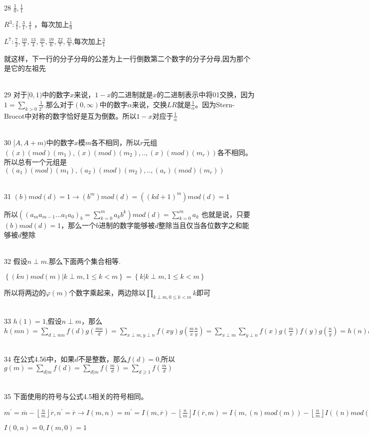 \documentclass[onecolumn]{article}
\begin{document}
~\\
28 $\frac{1}{0},\frac{1}{1}$ \par
$R^{3}:\frac{2}{1},\frac{3}{1},\frac{4}{1}$ ，每次加上$\frac{1}{0}$ \par
$L^{7}:\frac{7}{2},\frac{10}{3},\frac{13}{4},\frac{16}{5},\frac{19}{6},\frac{22}{7},\frac{25}{8}$,每次加上$\frac{3}{1}$ \par
就这样，下一行的分子分母的公差为上一行倒数第二个数字的分子分母,因为那个是它的左祖先 \par
~\\
29 对于$[0,1)$中的数字$x$来说，$1-x$的二进制就是$x$的二进制表示中将01交换，因为$1=\sum_{k>0}\frac{1}{2^{k}}$.那么对于$(0,\infty )$$中的数字\alpha$来说，交换$LR$就是$\frac{1}{\alpha}$。因为Stern-Brocot中对称的数字恰好是互为倒数。所以$1-x$对应于$\frac{1}{\alpha}$\par
~\\
30 $[A,A+m)$中的数字$x$模$m$各不相同，所以$r$元组$((x)(mod)(m_{1}),(x)(mod)(m_{2}),..,(x)(mod)(m_{r}))$各不相同。所以总有一个元组是$((a_{1})(mod)(m_{1}),(a_{2})(mod)(m_{2}),..,(a_{r})(mod)(m_{r}))$ \par
~\\

31 $(b)mod(d)=1\rightarrow (b^{m})mod(d)=((kd+1)^{m})mod(d)=1$\par
所以$((a_{m}a_{m-1}...a_{1}a_{0})_{b}=\sum_{k=0}^{m}a_{k}b^{k})mod(d)=\sum_{k=0}^{m}a_{k}$ 也就是说，只要$(b)mod(d)=1$，那么一个$b$进制的数字能够被$d$整除当且仅当各位数字之和能够被$d$整除\par
~\\
32 假设$n\perp m$.那么下面两个集合相等. \par
$\left \{ (kn)mod(m)|k\perp m ,1\le k <m\right \}=\left \{ k|k\perp m ,1\le k <m \right \}$\par
所以将两边的$\varphi (m)$个数字乘起来，两边除以$\prod _{k\perp m ,0\le k <m}k$即可 \par
~\\
33 $h(1)=1$,假设$n\perp m$，那么$h(mn)=\sum_{d\perp mn}f(d)g(\frac{mn}{d})=\sum_{x\perp m,y\perp n}f(xy)g(\frac{m}{x}\frac{n}{y})=\sum_{x\perp m}\sum_{y\perp n}f(x)g(\frac{m}{x})f(y)g(\frac{n}{y})=h(n)h(m)$ \par
~\\

34 在公式4.56中，如果$d$不是整数，那么$f(d)=0$,所以$g(m)=\sum_{d|m}f(d)=\sum_{d|m}f(\frac{m}{d})=\sum_{d\geq 1}f(\frac{m}{d})$ \par
~\\
35 下面使用的符号与公式4.5相关的符号相同。 \par
$m^{'}=\overline{m}-\left \lfloor \frac{n}{m} \right \rfloor\overline{r},n^{'}=\overline{r}\rightarrow I(m,n)=m^{'}=I(m,\overline{r})-\left \lfloor \frac{n}{m} \right \rfloor I(\overline{r},m)=I(m,(n)mod(m))-\left \lfloor \frac{n}{m} \right \rfloor I((n)mod(m),m),I(n,m)=n^{'}=(n)mod(m)$ \par
$I(0,n)=0,I(m,0)=1$ \par
~\\
\end{document}

